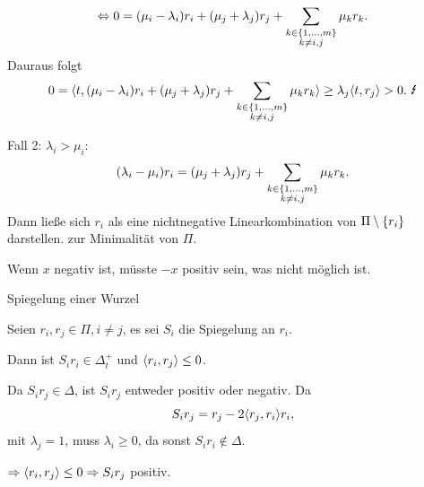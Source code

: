 \documentclass[18pt]{beamer}
\begin{document}
\begin{frame}
    \begin{bew}
        \[ \Leftrightarrow 0 = (\mu_i - \lambda_i)
        r_i + (\mu_j + \lambda_j) 
        r_j + 
        \sum_{
            \substack{k \in \{1,\ldots, m\}\\k \neq i,j}}
        \mu_k r_k. \] \pause
        Dauraus folgt 
        \[ 0 = \scalarprod{t}{ 
            (\mu_i - \lambda_i) r_i + (\mu_j + \lambda_j) r_j 
        + \sum_{\substack{k \in \set{1,\ldots, m}\\k \neq i,j}}
        \mu_k r_k
        } \geq \lambda_j \scalarprod{t}{r_j} > 0. 
        \text{ \Lightning} \]

        \renewcommand{\qedsymbol}{}
    \end{bew}
\end{frame}

\begin{frame}
    \begin{bew}
        Fall 2: \( \lambda_i > \mu_i \): 
        \[ (\lambda_i - \mu_i) r_i
        = (\mu_j + \lambda_j) r_j 
        + \sum_{\substack{k \in \{1,\ldots, m\}\\k \neq i,j}}
        \mu_k r_k. \]
        Dann ließe sich \( r_i \) als eine 
        nichtnegative Linearkombination von 
        \( \Pi \setminus \{r_i\} \) darstellen. 
        \Lightning{} zur Minimalität von 
        \( \Pi \).

        Wenn \( x \) negativ ist, müsste \( -x \) 
        positiv sein, was nicht möglich ist.
    \end{bew}
\end{frame}

\begin{frame}{Spiegelung einer Wurzel}
    \begin{satz} %
        Seien \( r_i, r_j \in \Pi, i \neq j \), es 
        sei \( S_i \) die Spiegelung an \( r_i \). 

        Dann ist \( S_i r_i \in \Delta_t^+ \) und 
        \( \langle r_i, r_j \rangle \leq 0 \).
    \end{satz}
    \pause
    \begin{bew}
        Da \( S_i r_j \in \Delta \), ist \( S_i r_j \) 
        entweder positiv oder negativ. Da 
        \[ S_i r_j = r_j - 2 \langle r_j, r_i \rangle r_i, \]
        mit \( \lambda_j = 1 \), muss 
        \( \lambda_i \geq 0 \), da sonst 
        \( S_i r_i \notin \Delta \). \pause

        \( \Rightarrow \langle r_i, r_j \rangle \leq 0 
        \Rightarrow S_i r_j \) 
        positiv.
    \end{bew}
\end{frame}
\end{document}
